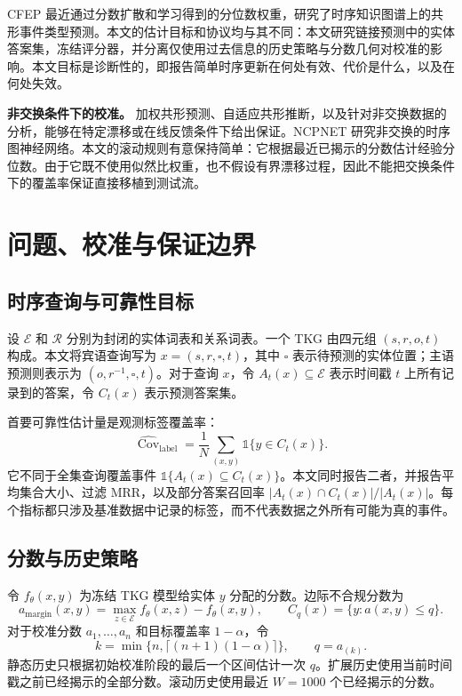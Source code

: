 \documentclass[UTF8,a4paper,11pt]{ctexart}
\newcommand{\cov}{\operatorname{Cov}}
\begin{document}
CFEP 最近通过分数扩散和学习得到的分位数权重，研究了时序知识图谱上的共形事件类型预测\cite{hu2026cfep}。本文的估计目标和协议均与其不同：本文研究链接预测中的实体答案集，冻结评分器，并分离仅使用过去信息的历史策略与分数几何对校准的影响。本文目标是诊断性的，即报告简单时序更新在何处有效、代价是什么，以及在何处失效。

\textbf{非交换条件下的校准。}
加权共形预测、自适应共形推断，以及针对非交换数据的分析，能够在特定漂移或在线反馈条件下给出保证\cite{tibshirani2019covariate,gibbs2021adaptive,barber2023beyond,farinhas2024nexcrc}。NCPNET 研究非交换的时序图神经网络\cite{wang2025ncpnet}。本文的滚动规则有意保持简单：它根据最近已揭示的分数估计经验分位数。由于它既不使用似然比权重，也不假设有界漂移过程，因此不能把交换条件下的覆盖率保证直接移植到测试流。

\section{问题、校准与保证边界}

\subsection{时序查询与可靠性目标}

设 \(\mathcal{E}\) 和 \(\mathcal{R}\) 分别为封闭的实体词表和关系词表。一个 TKG 由四元组 \((s,r,o,t)\) 构成。本文将宾语查询写为 \(x=(s,r,\square,t)\)，其中 \(\square\) 表示待预测的实体位置；主语预测则表示为 \((o,r^{-1},\square,t)\)。对于查询 \(x\)，令 \(A_t(x)\subseteq\mathcal{E}\) 表示时间戳 \(t\) 上所有记录到的答案，令 \(C_t(x)\) 表示预测答案集。

首要可靠性估计量是观测标签覆盖率：
\[
  \widehat{\cov}_{\mathrm{label}}
  =\frac{1}{N}\sum_{(x,y)}\mathbb{1}\{y\in C_t(x)\}.
\]
它不同于全集查询覆盖事件 \(\mathbb{1}\{A_t(x)\subseteq C_t(x)\}\)。本文同时报告二者，并报告平均集合大小、过滤 MRR，以及部分答案召回率 \(|A_t(x)\cap C_t(x)|/|A_t(x)|\)。每个指标都只涉及基准数据中记录的标签，而不代表数据之外所有可能为真的事件。

\subsection{分数与历史策略}

令 \(f_\theta(x,y)\) 为冻结 TKG 模型给实体 \(y\) 分配的分数。边际不合规分数为
\[
 a_{\mathrm{margin}}(x,y)=\max_{z\in\mathcal{E}}f_\theta(x,z)-f_\theta(x,y),
 \qquad C_q(x)=\{y:a(x,y)\le q\}.
 \tag{1}\label{zh:eq:margin}
\]
对于校准分数 \(a_1,\ldots,a_n\) 和目标覆盖率 \(1-\alpha\)，令
\[
 k=\min\{n,\lceil(n+1)(1-\alpha)\rceil\},\qquad q=a_{(k)}.
 \tag{2}\label{zh:eq:quantile}
\]
静态历史只根据初始校准阶段的最后一个区间估计一次 \(q\)。扩展历史使用当前时间戳之前已经揭示的全部分数。滚动历史使用最近 \(W=1000\) 个已经揭示的分数。
\end{document}
